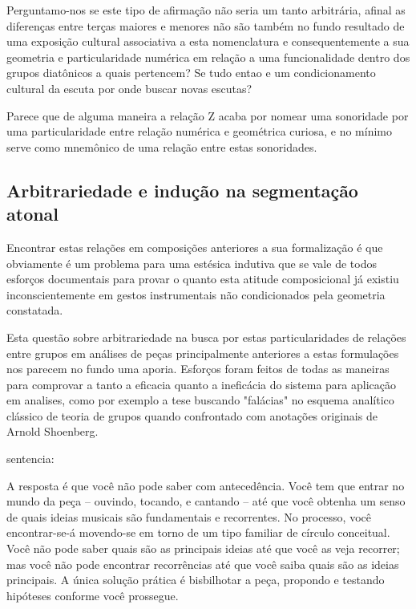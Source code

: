 \documentclass[
	12pt,				%
	openright,			%
	twoside,			%
	a4paper,			%
	english,			%
	french,				%
	spanish,			%
	brazil				%
	]{abntex2}
\begin{document}
Perguntamo-nos se este tipo de afirmação não seria um tanto arbitrária, afinal as diferenças entre terças maiores e menores não são também no fundo resultado de uma exposição cultural associativa a esta nomenclatura e consequentemente a sua geometria e particularidade numérica em relação a uma funcionalidade dentro dos grupos diatônicos a quais pertencem? Se tudo entao e um condicionamento cultural da escuta por onde buscar novas escutas?

Parece que de alguma maneira a relação Z acaba por nomear uma sonoridade por uma particularidade entre relação numérica e geométrica curiosa, e no mínimo serve como mnemônico de uma relação entre estas sonoridades.

\subsection{Arbitrariedade e indução  na segmentação atonal}

Encontrar estas relações em composições anteriores a sua formalização é que obviamente é um problema para uma estésica indutiva\cite{nattiez2001tripartite} que se vale de todos esforços documentais para provar o quanto esta atitude composicional já existiu inconscientemente em gestos instrumentais não condicionados pela geometria constatada.


Esta questão sobre arbitrariedade na busca por estas particularidades de relações entre grupos em análises de peças principalmente anteriores a estas formulações nos parecem no fundo uma aporia. Esforços foram feitos de todas as maneiras para comprovar a tanto a eficacia quanto a ineficácia do sistema para aplicação em analises, como por exemplo a tese  buscando "falácias" no esquema analítico clássico de teoria de grupos quando confrontado com anotações originais de Arnold Shoenberg.

\cite{straus2004} sentencia:

\begin{citacao}
A resposta é que você não pode saber com antecedência.
Você tem que entrar no mundo da peça – ouvindo, tocando, e cantando – até que você
obtenha um senso de quais ideias musicais são fundamentais e recorrentes. No processo,
você encontrar-se-á movendo-se em torno de um tipo familiar de círculo conceitual. Você
não pode saber quais são as principais ideias até que você as veja recorrer; mas você não
pode encontrar recorrências até que você saiba quais são as ideias principais. A única
solução prática é bisbilhotar a peça, propondo e testando hipóteses conforme você
prossegue. 
\cite{straus2004}
\end{citacao}
\end{document}
